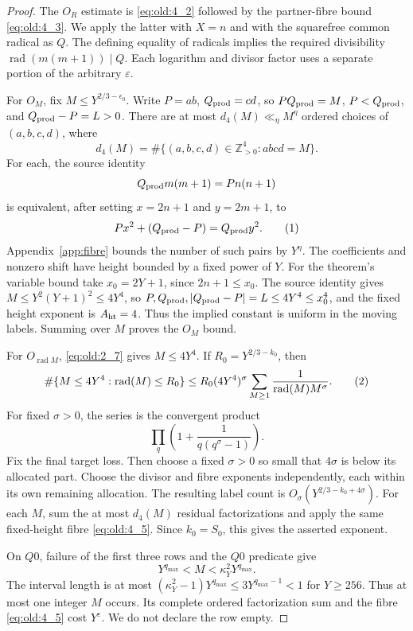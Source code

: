 \begin{proof}
The \(O_R\) estimate is \eqref{eq:old:4_2} followed by the partner-fibre bound \eqref{eq:old:4_3}.
We apply the latter with \(X=n\) and with the squarefree common radical
as \(Q\). The defining equality of radicals implies the required
divisibility \(\operatorname{rad}(m(m+1))\mid Q\). Each logarithm and divisor factor uses a
separate portion of the arbitrary \(\varepsilon\).

For \(O_M\), fix \(M\le Y^{2/3-\epsilon_0}\). Write
\(P=ab\), \(Q_{\rm prod}=cd\), so \(PQ_{\rm prod}=M\),
\(P<Q_{\rm prod}\), and \(Q_{\rm prod}-P=L>0\).
There are at most \(d_4(M)\ll_\eta M^\eta\) ordered choices of
\((a,b,c,d)\), where
\[
d_4(M)=\#\{(a,b,c,d)\in\mathbb Z_{>0}^4:abcd=M\}.
\]
For each, the source identity
\[
Q_{\rm prod}m(m+1)=Pn(n+1)
\]
is equivalent, after setting \(x=2n+1\) and \(y=2m+1\), to
\[
P x^2+(Q_{\rm prod}-P)=Q_{\rm prod}y^2.
\AutoTag{eq:old:4_5}
\]
Appendix~\ref{app:fibre} bounds the number of such pairs by \(Y^\eta\).
The coefficients and nonzero shift have height bounded by a fixed power
of \(Y\). For the theorem's variable bound take \(x_0=2Y+1\), since
\(2n+1\le x_0\). The source identity gives
\(M\le Y^2(Y+1)^2\le4Y^4\), so
\(P,Q_{\rm prod},|Q_{\rm prod}-P|=L\le4Y^4\le x_0^4\), and the
fixed height exponent is \(A_{\rm ht}=4\).
Thus the implied constant is uniform in the moving labels. Summing over
\(M\) proves the \(O_M\) bound.

For \(O_{\operatorname{rad}M}\), \eqref{eq:old:2_7} gives \(M\le4Y^4\). If
\(R_0=Y^{2/3-k_0}\), then
\[
\#\{M\le4Y^4:\operatorname{rad}(M)\le R_0\}
\le R_0(4Y^4)^\sigma
 \sum_{M\ge1}\frac1{\operatorname{rad}(M)M^\sigma}.
\AutoTag{eq:old:4_6}
\]
For fixed \(\sigma>0\), the series is the convergent product
\[
\prod_q\left(1+\frac1{q(q^\sigma-1)}\right).
\]
Fix the final target loss. Then choose a fixed \(\sigma>0\) so small
that \(4\sigma\) is below its allocated part. Choose the divisor and
fibre exponents independently, each within its own remaining allocation.
The resulting label count is
\(O_\sigma(Y^{2/3-k_0+4\sigma})\).
For each \(M\), sum the at most \(d_4(M)\) residual factorizations and
apply the same fixed-height fibre \eqref{eq:old:4_5}. Since \(k_0=S_0\), this gives
the asserted exponent.

On \(Q0\), failure of the first three rows and the \(Q0\) predicate give
\[
Y^{q_{\max}}<M<\kappa_Y^2Y^{q_{\max}}.
\]
The interval length is at most
\((\kappa_Y^2-1)Y^{q_{\max}}\le3Y^{q_{\max}-1}<1\) for \(Y\ge256\).
Thus at most one integer \(M\) occurs. Its complete ordered
factorization sum and the fibre \eqref{eq:old:4_5} cost \(Y^\varepsilon\). We do
not declare the row empty.


\end{proof}
